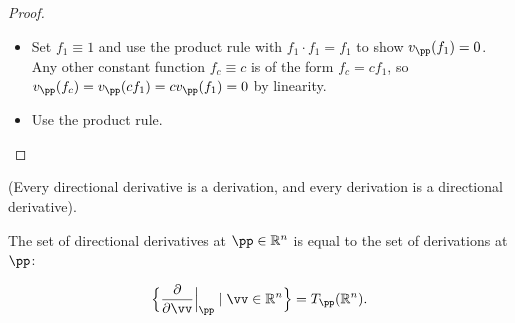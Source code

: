 \begin{proof}
    \mbox{} \\
    \begin{itemize}
        \item Set $f_1 \equiv 1$ and use the product rule with $f_1 \cdot f_1 = f_1$ to show $v_\pp(f_1) = 0$. Any other constant function $f_c \equiv c$ is of the form $f_c = cf_1$, so $v_\pp(f_c) = v_\pp(cf_1) = cv_\pp(f_1) = 0$ by linearity.
        \item Use the product rule.
    \end{itemize}
\end{proof}

\begin{theorem}
\label{ch::manifolds::thm::directional_derivs_same_as_derivs}
    (Every directional derivative is a derivation, and every derivation is a directional derivative).
    
    The set of directional derivatives at $\pp \in \R^n$ is equal to the set of derivations at $\pp$:
    
    \begin{align*}
        \Big\{\frac{\pd}{\pd \vv}\Big|_\pp \mid \vv \in \R^n\Big\}
        =
        T_\pp(\R^n).
    \end{align*}
\end{theorem}

